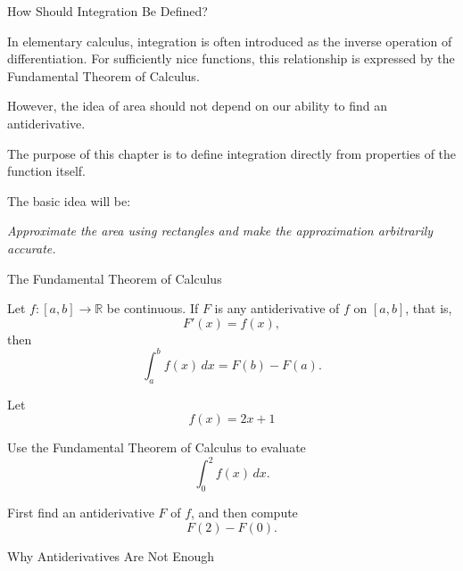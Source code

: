 \documentclass[12pt,a4paper]{article}
\begin{document}
\FrontPage
\Large

\begin{heading}
How Should Integration Be Defined?
\end{heading}

In elementary calculus, integration is often introduced as the inverse
operation of differentiation. For sufficiently nice functions, this
relationship is expressed by the Fundamental Theorem of Calculus.

However, the idea of area should not depend on our ability to find an
antiderivative.

The purpose of this chapter is to define integration directly from
properties of the function itself.

The basic idea will be:

\begin{center}
\emph{Approximate the area using rectangles and make the approximation
arbitrarily accurate.}
\end{center}

\clearpage

\begin{heading}
The Fundamental Theorem of Calculus
\end{heading}

\vspace{10pt}

\begin{theorem}
Let $f:[a,b]\to\mathbb{R}$ be continuous. If $F$ is any antiderivative
of $f$ on $[a,b]$, that is,
\[
F'(x)=f(x),
\]
then
\[
\int_a^b f(x)\,dx=F(b)-F(a).
\]
\end{theorem}

\clearpage

\begin{problem}
Let
\[
f(x)=2x+1\]

Use the Fundamental Theorem of Calculus to evaluate
\[
\int_0^2 f(x)\,dx.
\]

First find an antiderivative $F$ of $f$, and then compute
\[
F(2)-F(0).
\]
\end{problem}

\clearpage

\begin{heading}
Why Antiderivatives Are Not Enough
\end{heading}
\end{document}
